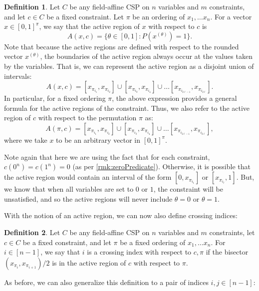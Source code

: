 \documentclass[11pt]{article}
\theoremstyle{definition}
\newtheorem{definition}{Definition}[section]
\begin{document}
\begin{definition}\label{def:activeRegions}
    Let $C$ be any field-affine CSP on $n$ variables and $m$ constraints, and let $c \in C$ be a fixed constraint. Let $\pi$ be an ordering of $x_1, \dots x_n$. For a vector $x \in [0,1]^{\pi}$, we say that the active region of $x$ with respect to $c$ is 
    \[
    A(x, c) = \{\theta \in [0,1]: P(x^{(\theta)}) =1 \}.
    \]
    Note that because the active regions are defined with respect to the rounded vector $x^{(\theta)}$, the boundaries of the active region always occur at the values taken by the variables. That is, we can represent the active region as a disjoint union of intervals:
    \[
    A(x, c) = [x_{\pi_{i_1}}, x_{\pi_{i_2}}] \cup [x_{\pi_{i_3}}, x_{\pi_{i_4}}] \cup \dots [x_{\pi_{i_{2\ell -1}}}, x_{\pi_{i_{2\ell}}}].
    \]
    In particular, for a fixed ordering $\pi$, the above expression provides a general formula for the active regions of the constraint. Thus, we also refer to the active region of $c$ with respect to the permutation $\pi$ as:
        \[
    A(\pi, c) = [x_{\pi_{i_1}}, x_{\pi_{i_2}}] \cup [x_{\pi_{i_3}}, x_{\pi_{i_4}}] \cup \dots [x_{\pi_{i_{2\ell -1}}}, x_{\pi_{i_{2\ell}}}],
    \]
    where we take $x$ to be an arbitrary vector in $[0,1]^{\pi}$.

    Note again that here we are using the fact that for each constraint, $c(0^n) = c(1^n) = 0$ (as per \cref{rmk:zeroPredicate}). Otherwise, it is possible that the active region would contain an interval of the form $[0, x_{\pi_{i_1}}]$ or $[x_{\pi_{i_{\ell}}}, 1]$. But, we know that when all variables are set to $0$ or $1$, the constraint will be unsatisfied, and so the active regions will never include $\theta = 0$ or $\theta = 1$.
\end{definition}

With the notion of an active region, we can now also define crossing indices:

\begin{definition}\label{def:crossingIndexGeneral}
    Let $C$ be any field-affine CSP on $n$ variables and $m$ constraints, let $c \in C$ be a fixed constraint, and let $\pi$ be a fixed ordering of $x_1, \dots x_n$. For $i \in [n-1]$, we say that $i$ is a crossing index with respect to $c, \pi$ if the bisector $(x_{\pi_i}, x_{\pi_{i+1}})/2$ is in the active region of $c$ with respect to $\pi$.
\end{definition}

As before, we can also generalize this definition to a pair of indices $i,j \in [n-1]$:
\end{document}
